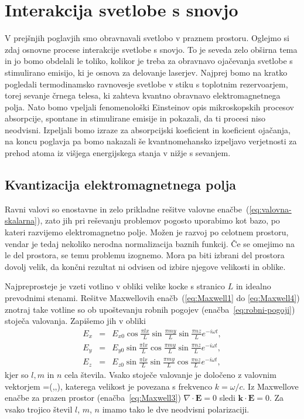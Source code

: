 \chapter{Interakcija svetlobe s snovjo}

V prejšnjih poglavjih smo obravnavali svetlobo v praznem prostoru. Oglejmo si
zdaj osnovne procese interakcije svetlobe s snovjo. To je seveda zelo
obširna tema in jo bomo obdelali le toliko, kolikor je treba za
obravnavo ojačevanja svetlobe s stimulirano emisijo, ki je osnova za
delovanje laserjev. Najprej bomo na kratko pogledali termodinamsko ravnovesje 
svetlobe v stiku s toplotnim rezervoarjem, torej sevanje črnega telesa, ki 
zahteva kvantno obravnavo elektromagnetnega polja. Nato bomo vpeljali fenomenološki
Einsteinov opis mikroskopskih procesov absorpcije, spontane in stimulirane
emisije in pokazali, da ti procesi niso neodvisni. Izpeljali bomo
izraze za absorpcijski koeficient in koeficient ojačanja, na koncu poglavja
pa bomo nakazali še kvantnomehansko izpeljavo verjetnosti za prehod
atoma iz višjega energijskega stanja v nižje s sevanjem.

\section{Kvantizacija elektromagnetnega polja}
Ravni valovi so enostavne in zelo prikladne rešitve valovne 
enačbe~(\ref{eq:valovna-skalarna}), zato jih pri reševanju problemov pogosto uporabimo kot 
bazo, po kateri razvijemo elektromagnetno polje. Možen je razvoj
po celotnem prostoru, vendar je tedaj nekoliko nerodna normalizacija baznih
funkcij. Če se omejimo na le del prostora, se temu problemu izognemo. Mora pa biti 
izbrani del prostora dovolj velik, da končni rezultat ni odvisen od izbire 
njegove velikosti in oblike.

Najpreprosteje je vzeti votlino v obliki velike kocke s stranico
$L$ in idealno prevodnimi stenami. Rešitve Maxwellovih enačb~(\ref{eq:Maxwell1} do \ref{eq:Maxwell4}) 
znotraj take votline so ob upoštevanju robnih pogojev (enačba~\ref{eq:robni-pogoji}) 
stoječa valovanja. Zapišemo jih v obliki
\begin{eqnarray}
E_{x} & = & E_{x0}\cos\frac{\pi lx}{L}\sin\frac{\pi my}{L}\sin\frac{\pi nz}{L}e^{-i\omega t},\nonumber \\
E_{y} & = & E_{y0}\sin\frac{\pi lx}{L}\cos\frac{\pi my}{L}\sin\frac{\pi nz}{L}e^{-i\omega t},\nonumber \\
E_{z} & = & E_{z0}\sin\frac{\pi lx}{L}\sin\frac{\pi my}{L}\cos\frac{\pi nz}{L}e^{-i\omega t},
\label{eq:stojece_votlina}
\end{eqnarray}
kjer so $l,m$ in $n$ cela števila. Vsako stoječe valovanje je določeno z valovnim 
vektorjem
\beq
{}=\left(,,\right),
\eeq 
katerega velikost je povezana s frekvenco $k = \omega/c$.
Iz Maxwellove enačbe za prazen prostor (enačba~\ref{eq:Maxwell3}) 
$\nabla\cdot\mathbf{E}=0$ sledi $\mathbf{k}\cdot\mathbf{E}=0$. 
Za vsako trojico števil $l$, $m$, $n$ imamo tako le dve
neodvisni polarizaciji.

